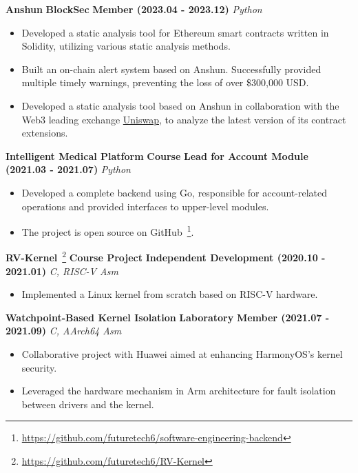     \noindent \textbf{Anshun} \textbar{} \textbf{BlockSec} \textbar{} \textbf{Member (2023.04 - 2023.12)} \hfill \textsl{Python}

    \begin{itemize}
        \item Developed a static analysis tool for Ethereum smart contracts written in Solidity, utilizing various static analysis methods.
        \item Built an on-chain alert system based on Anshun. Successfully provided multiple timely warnings, preventing the loss of over \$300,000 USD.
        \item Developed a static analysis tool based on Anshun in collaboration with the Web3 leading exchange \href{https://defillama.com/protocols/Dexes}{Uniswap}, to analyze the latest version of its contract extensions.
    \end{itemize}


    \ifdefined\qr

        \noindent \textbf{Intelligent Medical Platform} \textbar{} \textbf{Course} \textbar{} \textbf{Lead for Account Module (2021.03 - 2021.07)} \hfill \textsl{Python}

        \begin{itemize}
            \item Developed a complete backend using Go, responsible for account-related operations and provided interfaces to upper-level modules.
            \item The project is open source on GitHub~\footnote{\url{https://github.com/futuretech6/software-engineering-backend}}.
        \end{itemize}

    \fi

    \noindent \textbf{RV-Kernel}~\footnote{\url{https://github.com/futuretech6/RV-Kernel}} \textbar{} \textbf{Course Project} \textbar{} \textbf{Independent Development (2020.10 - 2021.01)} \hfill \textsl{C, RISC-V Asm}

    \begin{itemize}
        \item Implemented a Linux kernel from scratch based on RISC-V hardware.
    \end{itemize}

    \noindent \textbf{Watchpoint-Based Kernel Isolation} \textbar{} \textbf{Laboratory} \textbar{} \textbf{Member (2021.07 - 2021.09)} \hfill \textsl{C, AArch64 Asm}

    \begin{itemize}
        \item Collaborative project with Huawei aimed at enhancing HarmonyOS's kernel security.
        \item Leveraged the hardware mechanism in Arm architecture for fault isolation between drivers and the kernel.
    \end{itemize}

